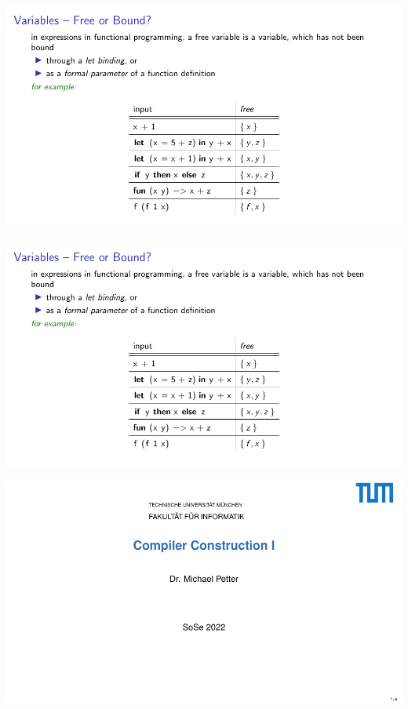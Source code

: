 \documentclass[10pt, landscape]{article}
\theoremstyle{definition}
\begin{document}
\begin{multicols*}{2}

\includegraphics[page=8, width=\columnwidth, trim= 0 0 0 0, clip]{./FlippedClassroom07.pdf}

\includegraphics[page=10, width=\columnwidth, trim= 0.75cm 1.2cm 0.3cm .75cm, clip]{./FlippedClassroom07.pdf}

\columnbreak

\includegraphics[page=270, width=\columnwidth]{./selfservice-handout.pdf}


\end{multicols*}
\end{document}
